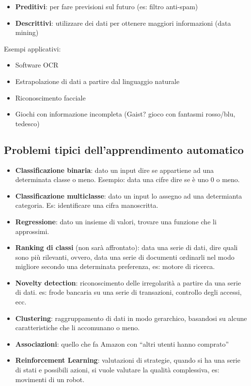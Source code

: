 \begin{itemize}
\tightlist
\item
  \textbf{Preditivi}: per fare previsioni sul futuro (es: filtro
  anti-spam)
\item
  \textbf{Descrittivi}: utilizzare dei dati per ottenere maggiori
  informazioni (data mining)
\end{itemize}

Esempi applicativi:

\begin{itemize}
\tightlist
\item
  Software OCR
\item
  Estrapolazione di dati a partire dal linguaggio naturale
\item
  Riconoscimento facciale
\item
  Giochi con informazione incompleta (Gaist? gioco con fantasmi
  rosso/blu, tedesco)
\end{itemize}

\subsection{Problemi tipici dell'apprendimento
automatico}\label{problemi-tipici-dellapprendimento-automatico}

\begin{itemize}
\tightlist
\item
  \textbf{Classificazione binaria}: dato un input dire se appartiene ad
  una determinata classe o meno. Esempio: data una cifre dire se è uno 0
  o meno.
\item
  \textbf{Classificazione multiclasse}: dato un input lo assegno ad una
  determianta categoria. Es: identificare una cifra manoscritta.
\item
  \textbf{Regressione}: dato un insieme di valori, trovare una funzione
  che li approssimi.
\item
  \textbf{Ranking di classi} (non sarà affrontato): data una serie di
  dati, dire quali sono più rilevanti, ovvero, data una serie di
  documenti ordinarli nel modo migliore secondo una determinata
  preferenza, es: motore di ricerca.
\item
  \textbf{Novelty detection}: riconoscimento delle irregolarità a
  partire da una serie di dati. es: frode bancaria su una serie di
  transazioni, controllo degli accessi, ecc.
\item
  \textbf{Clustering}: raggruppamento di dati in modo gerarchico,
  basandosi su alcune caratteristiche che li accomunano o meno.
\item
  \textbf{Associazioni}: quello che fa Amazon con ``altri utenti hanno
  comprato''
\item
  \textbf{Reinforcement Learning}: valutazioni di strategie, quando si
  ha una serie di stati e possibili azioni, si vuole valutare la qualità
  complessiva, es: movimenti di un robot.
\end{itemize}
